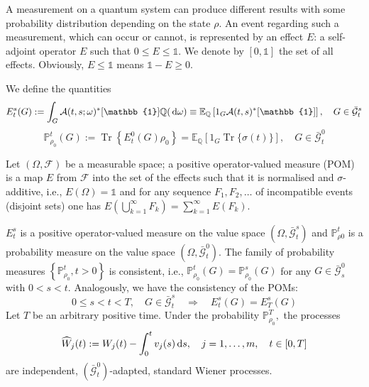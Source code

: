 A measurement on a quantum system can produce different results with some probability distribution depending on the state $ \rho $. An event regarding such a measurement, which can occur or cannot, is represented by an effect $E$: a self-adjoint operator $E$ such that $0 \leq E \leq \mathbb{1}$. We denote by $[0, \mathbb{1}]$ the set of all effects. Obviously, $E \leq \mathbb{1}$ means $\mathbb{1}-E \geq 0$.
\begin{definition}
	We define the quantities  \begin{equation}\label{def:POM}
	E_{t}^{s}(G):=\int_{G} \mathcal{A}(t, s ; \omega)^{*}[\mathbb{1}] \mathbb{Q}(\diff \omega) \equiv \mathbb{E}_{\mathbb{Q}}\left[1_{G} \mathcal{A}(t, s)^{*}[\mathbb{1}]\right], \quad G \in \bar{\mathcal{G}}_{t}^{s}
	\end{equation}
	\begin{equation}\label{def:physical probabilities}
	\mathbb{P}_{\rho_{0}}^{t}(G):=\operatorname{Tr}\left\{E_{t}^{0}(G) \rho_{0}\right\}=\mathbb{E}_{\mathbb{Q}}\left[1_{G} \operatorname{Tr}\{\sigma(t)\}\right], \quad G \in \bar{\mathcal{G}}_{t}^{0}
	\end{equation}
\end{definition}
\begin{definition}
	Let $(\Omega, \mathcal{F})$ be a measurable space; a positive operator-valued measure (POM) is a map $E$ from $\mathcal{F}$ into the set of the effects such that it is normalised and $\sigma$-additive, i.e.,  $E(\Omega)=\mathbb{1}$ and for any sequence $F_{1}, F_{2}, \ldots$ of incompatible events (disjoint sets) one has $E\left(\bigcup_{k=1}^{\infty} F_{k}\right)=\sum_{k=1}^{\infty} E\left(F_{k}\right)$.
\end{definition}
 \begin{proposition}\label{prop:explanation_intuition}
 	$E_{t}^{s}$ is a positive operator-valued measure on the value space $\left(\Omega, \bar{\mathcal{G}}_{t}^{s}\right)$ and $\mathbb{P}_{\rho 0}^{t}$ is a probability measure on the value space $\left(\Omega, \bar{\mathcal{G}}_{t}^{0}\right)$. The family of probability measures $\left\{\mathbb{P}_{\rho_{0}}^{t}, t>0\right\}$ is consistent, i.e.,  $\mathbb{P}_{\rho_{0}}^{t}(G)=\mathbb{P}_{\rho_{0}}^{s}(G)$ for any $G \in \bar{\mathcal{G}}_{s}^{0}$ with $0<s<t .$ Analogously, we have the consistency of the POMs:
 	\[ 0 \leq s<t<T, \quad G \in \bar{\mathcal{G}}_{t}^{s} \quad \Rightarrow \quad E_{t}^{s}(G)=E_{T}^{s}(G) \]
 	Let $T$ be an arbitrary positive time. Under the probability $\mathbb{P}_{\rho_{0}}^{T},$ the processes
 	\begin{equation}\label{def:W_hat}
 	\widehat{W}_{j}(t):=W_{j}(t)-\int_{0}^{t} v_{j}(s) \,\mathrm{d} s, \quad j=1, \ldots, m, \quad t \in[0, T]
 	\end{equation} are independent, $\left(\bar{\mathcal{G}}_{t}^{0}\right)$-adapted, standard Wiener processes.
 \end{proposition}

